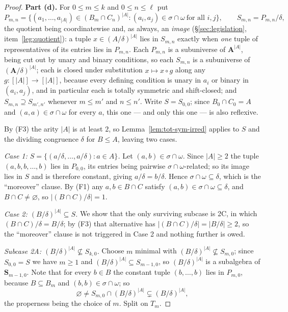 \begin{proof}
\medskip\noindent\textbf{Part (d).} For $0\le m\le k$ and $0\le n\le\ell$ put
\[
  P_{m,n}=\bigl\{(a_{1},\dots,a_{|A|})\in(B_{m}\cap C_{n})^{|A|}:
    (a_{i},a_{j})\in\sigma\cap\omega\ \text{for all }i,j\bigr\},
  \qquad S_{m,n}=P_{m,n}/\delta ,
\]
the quotient being coordinatewise and, as always, an \emph{image}
(\S\ref{sec:legislation}, item~\ref{leg:quotient}): a tuple
$x\in(A/\delta)^{|A|}$ lies in $S_{m,n}$ exactly when \emph{one} tuple of
representatives of its entries lies in $P_{m,n}$. Each $P_{m,n}$ is a
subuniverse of $\mathbf A^{|A|}$, being cut out by unary and binary
conditions, so each $S_{m,n}$ is a subuniverse of $(\mathbf A/\delta)^{|A|}$;
each is closed under substitution $x\mapsto x\circ g$ along any
$g:[|A|]\to[|A|]$, because every defining condition is unary in $a_{i}$ or
binary in $(a_{i},a_{j})$, and in particular each is totally symmetric and
shift-closed; and $S_{m,n}\supseteq S_{m',n'}$ whenever $m\le m'$ and
$n\le n'$. Write $S=S_{0,0}$; since $B_{0}\cap C_{0}=A$ and
$(a,a)\in\sigma\cap\omega$ for every $a$, this one --- and only this one --- is
also reflexive.

By (F3) the arity $|A|$ is at least $2$, so Lemma~\ref{lem:tot-sym-irred}
applies to $S$ and the dividing congruence $\delta$ for $B\le A$, leaving two
cases.

\emph{Case 1: $S=\{(a/\delta,\dots,a/\delta):a\in A\}$.} Let
$(a,b)\in\sigma\cap\omega$. Since $|A|\ge2$ the tuple $(a,b,b,\dots,b)$ lies
in $P_{0,0}$, its entries being pairwise $\sigma\cap\omega$-related; so its
image lies in $S$ and is therefore constant, giving $a/\delta=b/\delta$. Hence
$\sigma\cap\omega\subseteq\delta$, which is the ``moreover'' clause. By (F1)
any $a,b\in B\cap C$ satisfy $(a,b)\in\sigma\cap\omega\subseteq\delta$, and
$B\cap C\neq\varnothing$, so $|(B\cap C)/\delta|=1$.

\emph{Case 2: $(B/\delta)^{|A|}\subseteq S$.} We show that the only surviving
subcase is 2C, in which $(B\cap C)/\delta=B/\delta$; by (F3) that alternative
has $|(B\cap C)/\delta|=|B/\delta|\ge2$, so the ``moreover'' clause is not
triggered in Case 2 and nothing further is owed.

\emph{Subcase 2A: $(B/\delta)^{|A|}\not\subseteq S_{k,0}$.} Choose $m$ minimal
with $(B/\delta)^{|A|}\not\subseteq S_{m,0}$; since $S_{0,0}=S$ we have
$m\ge1$ and $(B/\delta)^{|A|}\subseteq S_{m-1,0}$, so $(B/\delta)^{|A|}$ is a
subalgebra of $\mathbf S_{m-1,0}$. Note that for every $b\in B$ the constant
tuple $(b,\dots,b)$ lies in $P_{m,0}$, because $B\subseteq B_{m}$ and
$(b,b)\in\sigma\cap\omega$; so
\begin{equation}\label{eq:ig-2A-nonempty}
  \varnothing\neq S_{m,0}\cap(B/\delta)^{|A|}\subsetneq(B/\delta)^{|A|},
\end{equation}
the properness being the choice of $m$. Split on $T_{m}$.


\end{proof}
